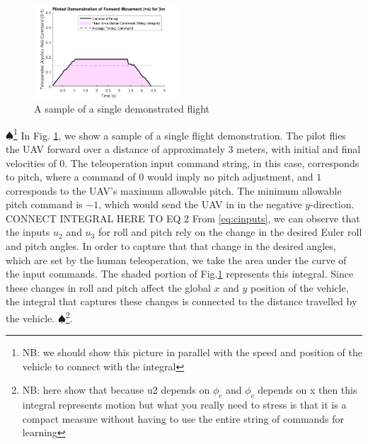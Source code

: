 \documentclass[letterpaper, 10 pt, conference]{ieeeconf}  %
\newcommand\NB[1]{$\spadesuit$\footnote{NB: #1}}
\begin{document}
\begin{figure}[ht]
    \includegraphics[width=0.48\textwidth]{images/sampleintegral.png}
    \caption{A sample of a single demonstrated flight}
    \label{fig:sampleintegral}
\end{figure}
\NB{we should show this picture in parallel with the speed and position of the vehicle to connect with the integral}
In Fig. \ref{fig:sampleintegral}, we show a sample of a single flight demonstration. The pilot flies the UAV forward over a distance of approximately $3$ meters, with initial and final velocities of $0$. The teleoperation input command string, in this case, corresponds to pitch, where a command of $0$ would imply no pitch adjustment, and $1$ corresponds to the UAV's maximum allowable pitch. The minimum allowable pitch command is $-1$, which would send the UAV in in the negative $y$-direction. 
{\color{red}CONNECT INTEGRAL HERE TO EQ 2}
From \eqref{eq:cinputs}, we can observe that the inputs $u_2$ and $u_3$ for roll and pitch rely on the change in the desired Euler roll and pitch angles. In order to capture that that change in the desired angles, which are set by the human teleoperation, we take the area under the curve of the input commands. The shaded portion of Fig.\ref{fig:sampleintegral} represents this integral. Since these changes in roll and pitch affect the global $x$ and $y$ position of the vehicle, the integral that captures these changes is connected to the distance travelled by the vehicle.
\NB{here show that because u2 depends on $\phi_c$ and $\phi_c$ depends on x then this integral represents motion but what you really need to stress is that it is a compact measure without having to use the entire string of commands for learning}.
\end{document}
